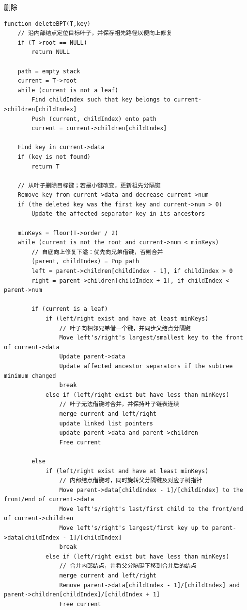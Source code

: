 \documentclass[openany]{book}
\begin{document}
删除
\begin{lstlisting}
function deleteBPT(T,key)
    // 沿内部结点定位目标叶子，并保存祖先路径以便向上修复
    if (T->root == NULL)
        return NULL

    path = empty stack
    current = T->root
    while (current is not a leaf)
        Find childIndex such that key belongs to current->children[childIndex]
        Push (current, childIndex) onto path
        current = current->children[childIndex]

    Find key in current->data
    if (key is not found)
        return T

    // 从叶子删除目标键；若最小键改变，更新祖先分隔键
    Remove key from current->data and decrease current->num
    if (the deleted key was the first key and current->num > 0)
        Update the affected separator key in its ancestors

    minKeys = floor(T->order / 2)
    while (current is not the root and current->num < minKeys)
        // 自底向上修复下溢：优先向兄弟借键，否则合并
        (parent, childIndex) = Pop path
        left = parent->children[childIndex - 1], if childIndex > 0
        right = parent->children[childIndex + 1], if childIndex < parent->num

        if (current is a leaf)
            if (left/right exist and have at least minKeys)
                // 叶子向相邻兄弟借一个键，并同步父结点分隔键
                Move left's/right's largest/smallest key to the front of current->data
                Update parent->data
                Update affected ancestor separators if the subtree minimum changed
                break
            else if (left/right exist but have less than minKeys)
                // 叶子无法借键时合并，并保持叶子链表连续
                merge current and left/right
                update linked list pointers
                update parent->data and parent->children   
                Free current
            
        else
            if (left/right exist and have at least minKeys)
                // 内部结点借键时，同时旋转父分隔键及对应子树指针
                Move parent->data[childIndex - 1]/[childIndex] to the front/end of current->data
                Move left's/right's last/first child to the front/end of current->children
                Move left's/right's largest/first key up to parent->data[childIndex - 1]/[childIndex]
                break
            else if (left/right exist but have less than minKeys)
                // 合并内部结点，并将父分隔键下移到合并后的结点
                merge current and left/right
                Remove parent->data[childIndex - 1]/[childIndex] and parent->children[childIndex]/[childIndex + 1]
                Free current


\end{lstlisting}
\end{document}
